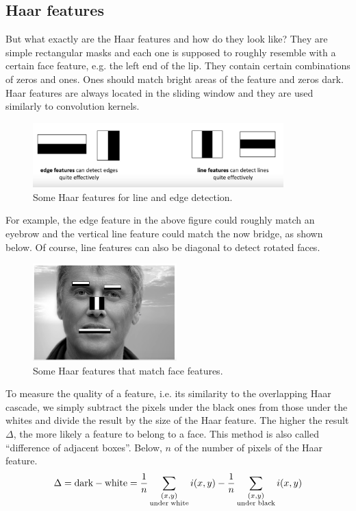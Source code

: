 \documentclass[a4paper]{article}
\begin{document}
\subsection{Haar features}
But what exactly are the Haar features and how do they look like? They are simple rectangular masks and each one is supposed to roughly resemble with a certain face feature, e.g. the left end of the lip. They contain certain combinations of zeros and ones. Ones should match bright areas of the feature and zeros dark. Haar features are always located in the sliding window and they are used similarly to convolution kernels.
\begin{figure}[H]
    \centering
    \includegraphics[height=2.5cm]{img/haar_simple_feat.png}
    \caption{Some Haar features for line and edge detection.}
\end{figure}
For example, the edge feature in the above figure could roughly match an eyebrow and the vertical line feature could match the now bridge, as shown below. Of course, line features can also be diagonal to detect rotated faces.
\begin{figure}[H]
    \centering
    \includegraphics[height=3.75cm]{img/haar_feat_face.png}
    \caption{Some Haar features that match face features.}
\end{figure}
To measure the quality of a feature, i.e. its similarity to the overlapping Haar cascade, we simply subtract the pixels under the black ones from those under the whites and divide the result by the size of the Haar feature. The higher the result $\Delta$, the more likely a feature to belong to a face. This method is also called ``difference of adjacent boxes''. Below, $n$ of the number of pixels of the Haar feature.
\begin{equation}
    \Delta = \textup{dark} - \textup{white} = \frac{1}{n} \sum \limits_{\substack{(x,y)\\ \textup{under}\;\textup{white}}}i(x,y)
    - \frac{1}{n} \sum \limits_{\substack{(x,y)\\ \textup{under}\;\textup{black}}}i(x,y)
\end{equation}
\end{document}

